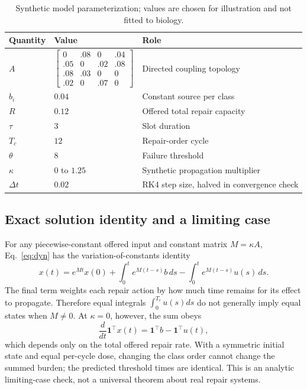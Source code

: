 \documentclass[10pt,letterpaper]{article}
\begin{document}
\begin{table}[H]
\centering\small
\caption{Synthetic model parameterization; values are chosen for illustration and not fitted to biology.}
\label{tab:params}
\begin{tabular}{lll}
\toprule
\textbf{Quantity} & \textbf{Value} & \textbf{Role}\\
\midrule
$A$ & $\begin{bmatrix}0&.08&0&.04\\.05&0&.02&.08\\.08&.03&0&0\\.02&0&.07&0\end{bmatrix}$ & Directed coupling topology\\
$b_i$ & $0.04$ & Constant source per class\\
$R$ & $0.12$ & Offered total repair capacity\\
$\tau$ & $3$ & Slot duration\\
$T_c$ & $12$ & Repair-order cycle\\
$\theta$ & $8$ & Failure threshold\\
$\kappa$ & $0$ to $1.25$ & Synthetic propagation multiplier\\
$\Delta t$ & $0.02$ & RK4 step size, halved in convergence check\\
\bottomrule
\end{tabular}
\end{table}

\subsection{Exact solution identity and a limiting case}
For any piecewise-constant offered input and constant matrix $M=\kappa A$, Eq.~\ref{eq:dyn} has the variation-of-constants identity
\begin{equation}
x(t)=e^{Mt}x(0)+\int_0^t e^{M(t-s)}b\,ds-\int_0^t e^{M(t-s)}u(s)\,ds.\label{eq:variation}
\end{equation}
The final term weights each repair action by how much time remains for its effect to propagate. Therefore equal integrals $\int_0^{T_c}u(s)ds$ do not generally imply equal states when $M\neq0$. At $\kappa=0$, however, the sum obeys
\begin{equation}
\frac{d}{dt}\mathbf{1}^{\top}x(t)=\mathbf{1}^{\top}b-\mathbf{1}^{\top}u(t),\label{eq:sum}
\end{equation}
which depends only on the total offered repair rate. With a symmetric initial state and equal per-cycle dose, changing the class order cannot change the summed burden; the predicted threshold times are identical. This is an analytic limiting-case check, not a universal theorem about real repair systems.
\end{document}
